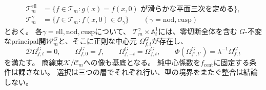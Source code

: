 \begin{theorem}[各三変数制限層上の全ブロック群に関する選択]
\label{thm:pg-equivariant-parabolic-center}
\begin{equation}
 \begin{aligned}
 \mathcal T_m^{\mathrm{ell}}
 &=\{f\in\mathcal T_m:g(x)=f(x,0)\text{ が滑らかな平面三次を定める}\},\\
 \mathcal T_m^\gamma
 &=\{f\in\mathcal T_m:f(x,0)\in\mathcal O_\gamma\}
       \qquad(\gamma=\mathrm{nod},\mathrm{cusp})
 \end{aligned}
 \label{eq:pg-equivariant-elliptic-base}
\end{equation}
とおく。
各$\gamma=\mathrm{ell},\mathrm{nod},\mathrm{cusp}$について、
$\mathcal T_m^\gamma\times\mathbb A^1_t$には、零切断全体を含む
$G$-不変なprincipal開$\mathcal W_m^G$と、そこに正則な中心元
$\Omega^G_{f,t}$が存在し、
\begin{equation}
 \mathcal D\Omega^G_{f,t}=0,\qquad
 \Omega^G_{f,0}=f,\qquad
 \Omega^G_{f,-t}=\Omega^G_{f,t},\qquad
 \Phi(\Omega^G_{f',t'})=\lambda^{-1}\Omega^G_{f,t}
 \label{eq:pg-equivariant-parabolic-center}
\end{equation}
を満たす。
商線束$\mathcal K/\mathcal C_m$への像も基底となる。
純中心係数を$f_{\mathrm{cent}}$に固定する条件は課さない。
選択は三つの層でそれぞれ行い、型の境界をまたぐ整合は結論しない。
\end{theorem}
